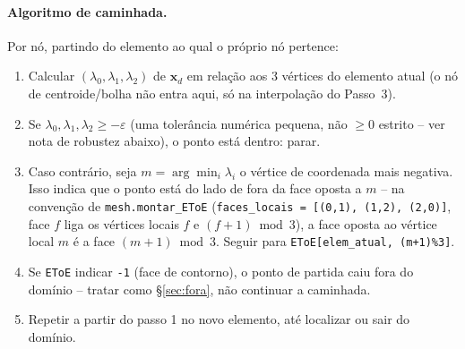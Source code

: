 \documentclass[11pt,a4paper]{article}
\begin{document}
\paragraph{Algoritmo de caminhada.} Por nó, partindo do elemento ao
qual o próprio nó pertence:
\begin{enumerate}
  \item Calcular $(\lambda_0, \lambda_1, \lambda_2)$ de
    $\mathbf{x}_d$ em relação aos 3 vértices do elemento atual (o nó
    de centroide/bolha não entra aqui, só na interpolação do
    Passo~3).
  \item Se $\lambda_0, \lambda_1, \lambda_2 \ge -\varepsilon$ (uma
    tolerância numérica pequena, não $\ge 0$ estrito -- ver nota de
    robustez abaixo), o ponto está dentro: parar.
  \item Caso contrário, seja $m = \arg\min_i \lambda_i$ o vértice de
    coordenada mais negativa. Isso indica que o ponto está do lado
    de fora da face oposta a $m$ -- na convenção de
    \texttt{mesh.montar\_EToE} (\texttt{faces\_locais = [(0,1),
    (1,2), (2,0)]}, face $f$ liga os vértices locais $f$ e
    $(f+1)\bmod 3$), a face oposta ao vértice local $m$ é a face
    $(m+1)\bmod 3$. Seguir para \texttt{EToE[elem\_atual, (m+1)\%3]}.
  \item Se \texttt{EToE} indicar \texttt{-1} (face de contorno), o
    ponto de partida caiu fora do domínio -- tratar como
    \S\ref{sec:fora}, não continuar a caminhada.
  \item Repetir a partir do passo 1 no novo elemento, até localizar
    ou sair do domínio.
\end{enumerate}
\end{document}
